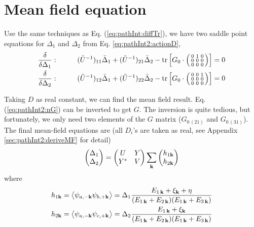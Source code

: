 \section{Mean field equation \label{sec:pathInt2:meanfield}}
Use the same techniques as Eq. (\ref{eq:pathInt:diffTr}), we have two saddle point equations for $\Delta_{1}$ and $\Delta_{2}$ from Eq. \eqref{eq:pathInt2:actionD},
 \begin{align}
\frac{\delta}{\delta{}\Delta_{1}}:&\qquad&
(\tilde{U}^{-1})_{11}\bar{\Delta}_{1}+(\tilde{U}^{-1})_{21}\bar{\Delta}_{2}-\text{tr}\left[{G_{0}}\cdot\left(\begin{smallmatrix}0&1&0\\0&0&0\\0&0&0\end{smallmatrix}\right)\right]=0
\label{eq:pathInt2:mf01}\\
\frac{\delta}{\delta{}\Delta_{2}}:&\qquad&
(\tilde{U}^{-1})_{12}\bar{\Delta}_{1}+(\tilde{U}^{-1})_{22}\bar{\Delta}_{2}-\text{tr}\left[{G_{0}}\cdot\left(\begin{smallmatrix}0&0&1\\0&0&0\\0&0&0\end{smallmatrix}\right)\right]=0
\label{eq:pathInt2:mf02}
 \end{align}
 
 
 Taking $D$ as real constant,
  we can find the mean field result. Eq. (\ref{eq:pathInt2:nG}) can be inverted to get $G$.  The inversion is quite tedious, but fortunately, we only need two elements of the $G$ matrix ($G_{0\, (21)}$ and $G_{0 \,(31)}$).  The final mean-field equations are (all $D_{i}$'s are taken as real, see Appendix \ref{sec:pathInt2:deriveMF} for detail) 
  \begin{equation}\label{eq:pathInt2:mf}
\begin{pmatrix}\Delta_1\\\Delta_2\end{pmatrix}=\begin{pmatrix}U&Y\\Y^{*}&V\end{pmatrix}\sum_{\mathbf{k}}\begin{pmatrix}h_{1\mathbf{k}}\\h_{2\mathbf{k}}\end{pmatrix}
\end{equation}
  where 
  \begin{gather}
  h_{1\mathbf{k}}=\bigl<{\psi_{a,-{\mathbf{k}}}\psi_{b,+{\mathbf{k}}}}\bigr>
  =\Delta_{1}\frac{E_{1\,\mathbf{k}}+\xi_{\mathbf{k}}+\eta}{(E_{1\,\mathbf{k}}+E_{2\,\mathbf{k}})(E_{1\,\mathbf{k}}+E_{3\,\mathbf{k}})}\label{eq:pathInt2:h1}\\
  h_{2\mathbf{k}}=\bigl<{\psi_{a,-{\mathbf{k}}}\psi_{c,+{\mathbf{k}}}}\bigr>
  =\Delta_{2}\frac{E_{1\,\mathbf{k}}+\xi_{\mathbf{k}}}{(E_{1\,\mathbf{k}}+E_{2\,\mathbf{k}})(E_{1\,\mathbf{k}}+E_{3\,\mathbf{k}})}\label{eq:pathInt2:h2}
  \end{gather}



